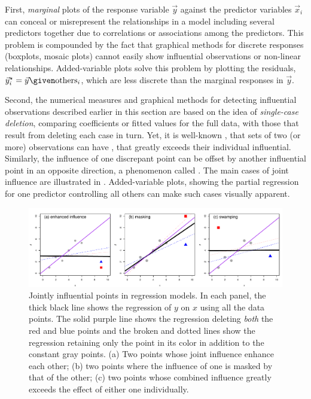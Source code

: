 \documentclass[11pt]{book}
\begin{document}
First, \emph{marginal} plots of the response variable $\vec{y}$ against the predictor variables
$\vec{x}_i$ can conceal or misrepresent the relationships in a model including several
predictors together due to correlations or associations among the predictors.   This problem is compounded by the fact that graphical methods for discrete responses (boxplots, mosaic plots)
cannot easily show influential observations or non-linear relationships.  Added-variable
plots solve this problem by plotting the residuals,
$\vec{y}_i^\star = \vec{y} \given \mbox{others}_i$, which are less discrete than the
marginal responses in $\vec{y}$.

Second, the numerical measures and graphical methods for detecting influential observations described
earlier in this section are based on the idea of \emph{single-case deletion}, comparing
coefficients or fitted values for the full data, with those that result from deleting each
case in turn.
Yet, it is well-known \citep{Lawrance:1995}, that sets of two (or more) observations can
have , that greatly exceeds their individual influential.  
Similarly, the influence of one discrepant point can be offset by another influential point
in an opposite direction, a phenomenon called . The main 
cases of joint influence are illustrated in .
Added-variable plots, showing the partial regression for one predictor controlling all others
can make such cases visually apparent.

\begin{figure}[!htb]
  \includegraphics[width=\textwidth]{ch07/fig/joint}
  \caption{Jointly influential points in regression models. In each panel, the thick black line
  shows the regression of $y$ on $x$ using all the data points.  The solid purple line shows
  the regression deleting \emph{both} the red and blue points and the broken and dotted lines
  show the regression retaining only the point in its color in addition to the constant gray points. 
  (a) Two points whose joint influence enhance each other; (b) two points where the influence of one
  is masked by that of the other; (c) two points whose combined influence greatly exceeds the effect of either one individually.}
  \label{fig:joint}
\end{figure}
\end{document}
